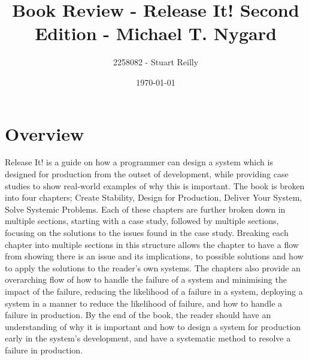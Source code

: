 \documentclass[11pt]{article}
\begin{document}
\title{Book Review - Release It! Second Edition - Michael T. Nygard}

\author{2258082 - Stuart Reilly}

\date{\today}

\maketitle

\section{Overview}
Release It! is a guide on how a programmer can design a system which is designed for production 
from the outset of development, while providing case studies to show real-world examples of why
this is important.
The book is broken into four chapters; Create Stability, Design for Production, Deliver Your 
System, Solve Systemic Problems.
Each of these chapters are further broken down in multiple sections, starting with a case study,
followed by multiple sections, focusing on the solutions to the issues found in the case study.
Breaking each chapter into multiple sections in this structure allows the chapter to have a flow
from showing there is an issue and its implications, to possible solutions and how to apply the
solutions to the reader's own systems.
The chapters also provide an overarching flow of how to handle the failure of a system and 
minimising the impact of the failure, reducing the likelihood of a failure in a system,
deploying a system in a manner to reduce the likelihood of failure, and how to handle a failure
in production.
By the end of the book, the reader should have an understanding of why it is important and how to 
design a system for production early in the system's development, and have a systematic method to 
resolve a failure in production.



\end{document}
